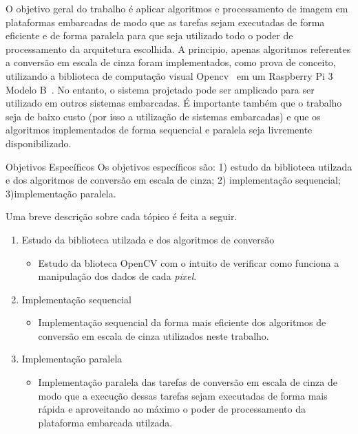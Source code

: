 O objetivo geral do trabalho é aplicar algoritmos e processamento de imagem em
plataformas embarcadas de modo que as tarefas sejam executadas de forma
eficiente e de forma paralela para que seja utilizado todo o poder de
processamento da arquitetura escolhida. A principio, apenas algoritmos
referentes a conversão em escala de cinza foram implementados, como prova de
conceito, utilizando a biblioteca de computação visual Opencv~\cite{opencv} em
um Raspberry Pi 3 Modelo B~\cite{raspberry}. No entanto, o sistema projetado
pode ser amplicado para ser utilizado em outros sistemas embarcadas. É
importante também que o trabalho seja de baixo custo (por isso a utilização de
sistemas embarcadas) e que os algoritmos implementados de forma sequencial e
paralela seja livremente disponibilizado.

\begin{subsection}{Objetivos Específicos}
Os objetivos específicos são: 1) estudo da biblioteca utilzada e dos algoritmos de conversão
em escala de cinza; 2) implementação sequencial; 3)implementação paralela.

Uma breve descrição sobre cada tópico é feita a seguir.

\begin{enumerate}

\item Estudo da biblioteca utilzada e dos algoritmos de conversão
\begin{itemize}
\item Estudo da blioteca OpenCV com o intuito de verificar como funciona a manipulação dos
dados de cada \textit{pixel}.
\end{itemize}

\item Implementação sequencial 

\begin{itemize}
\item Implementação sequencial da forma mais eficiente dos algoritmos de
conversão em escala de cinza utilizados neste trabalho.
\end{itemize} 
\item Implementação paralela


\begin{itemize} 

\item Implementação paralela das tarefas de conversão em escala de cinza de modo
que a execução dessas tarefas sejam executadas de forma mais rápida e
aproveitando ao máximo o poder de processamento da plataforma embarcada
utilzada.
\end{itemize} 
\end{enumerate}

\end{subsection}



